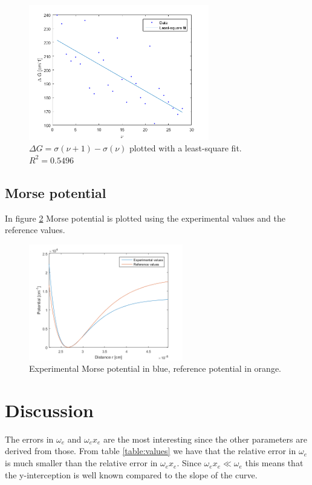 \documentclass[12pt]{article}
\begin{document}
\begin{figure}[ht]
    \centering
    \includegraphics[width=0.7\textwidth]{curve}
    
    \caption{$\Delta G = \sigma(\nu + 1) - \sigma(\nu)$ plotted with a least-square fit. $R^2 = 0.5496$}
    \label{figure:curve}
\end{figure}

\pagebreak
\subsection{Morse potential}
In figure \ref{figure:morse} Morse potential is plotted using the experimental values and the reference values.
\begin{figure}[ht]
    \centering
    \includegraphics[width=0.6\textwidth]{morse}
    
    \caption{Experimental Morse potential in blue, reference potential in orange.}
    \label{figure:morse}
\end{figure}

\pagebreak
\section{Discussion}
The errors in $\omega_e$ and $\omega_ex_e$ are the most interesting since the other parameters are derived from those. From table \ref{table:values} we have that the relative error in $\omega_e$ is much smaller than the relative error in $\omega_ex_e$. Since $\omega_ex_e \ll \omega_e$ this means that the y-interception is well known compared to the slope of the curve. 
\end{document}
